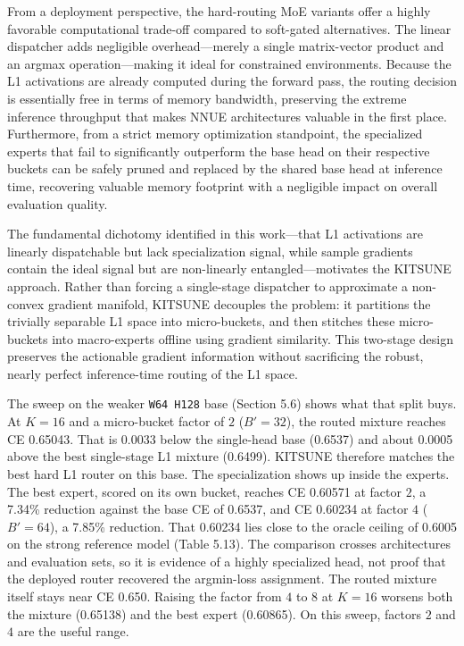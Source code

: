 From a deployment perspective, the hard-routing MoE variants offer a highly favorable computational trade-off compared to soft-gated alternatives. The linear dispatcher adds negligible overhead---merely a single matrix-vector product and an argmax operation---making it ideal for constrained environments. Because the L1 activations are already computed during the forward pass, the routing decision is essentially free in terms of memory bandwidth, preserving the extreme inference throughput that makes NNUE architectures valuable in the first place. Furthermore, from a strict memory optimization standpoint, the specialized experts that fail to significantly outperform the base head on their respective buckets can be safely pruned and replaced by the shared base head at inference time, recovering valuable memory footprint with a negligible impact on overall evaluation quality.

The fundamental dichotomy identified in this work---that L1 activations are linearly dispatchable but lack specialization signal, while sample gradients contain the ideal signal but are non-linearly entangled---motivates the KITSUNE approach. Rather than forcing a single-stage dispatcher to approximate a non-convex gradient manifold, KITSUNE decouples the problem: it partitions the trivially separable L1 space into micro-buckets, and then stitches these micro-buckets into macro-experts offline using gradient similarity. This two-stage design preserves the actionable gradient information without sacrificing the robust, nearly perfect inference-time routing of the L1 space.

The sweep on the weaker \texttt{W64 H128} base (Section 5.6) shows what that split buys. At $K=16$ and a micro-bucket factor of $2$ ($B'=32$), the routed mixture reaches CE 0.65043. That is 0.0033 below the single-head base (0.6537) and about 0.0005 above the best single-stage L1 mixture (0.6499). KITSUNE therefore matches the best hard L1 router on this base. The specialization shows up inside the experts. The best expert, scored on its own bucket, reaches CE 0.60571 at factor $2$, a 7.34\% reduction against the base CE of 0.6537, and CE 0.60234 at factor $4$ ($B'=64$), a 7.85\% reduction. That 0.60234 lies close to the oracle ceiling of 0.6005 on the strong reference model (Table 5.13). The comparison crosses architectures and evaluation sets, so it is evidence of a highly specialized head, not proof that the deployed router recovered the argmin-loss assignment. The routed mixture itself stays near CE 0.650. Raising the factor from $4$ to $8$ at $K=16$ worsens both the mixture (0.65138) and the best expert (0.60865). On this sweep, factors $2$ and $4$ are the useful range.

